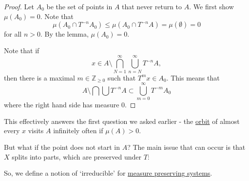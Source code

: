 \documentclass{article}
\newcommand{\named}[1]{\textbf{#1}\index{#1}}
\begin{document}
\begin{proof}
  Let $A_0$ be the set of points in $A$ that never return to $A$.
  We first show $\mu(A_0) = 0$.
  Note that
  \begin{equation*}\mu(A_0 \cap T^{-n} A_0) \leq \mu(A_0 \cap T^{-n} A) = \mu(\emptyset) = 0\end{equation*}
  for all $n > 0$.
  By the lemma, $\mu(A_0) = 0$.

  Note that if
  \begin{equation*}x \in A \setminus \bigcap_{N=1}^\infty \bigcup_{n=N}^\infty T^{-n} A,\end{equation*}
  then there is a maximal $m \in \mathbb{Z}_{\geq 0}$ such that $T^m x \in A_0$.
  This means that
  \begin{equation*}
    A \setminus \bigcap \bigcup T^{-n} A \subset \bigcup_{m=0}^\infty T^{-m} A_0
  \end{equation*}
  where the right hand side has measure 0.
\end{proof}

This effectively answers the first question we asked earlier - the \hyperlink{def:orbit}{orbit} of almost every $x$ visits $A$ infinitely often if $\mu(A) > 0$.

But what if the point does not start in $A$?
The main issue that can occur is that $X$ splits into parts, which are preserved under $T$:
\begin{center}
\end{center}

So, we define a notion of `irreducible' for \hyperlink{def:mps}{measure preserving systems}.
\end{document}
